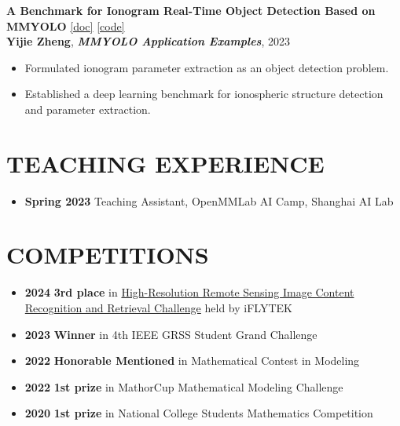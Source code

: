 \documentclass[11pt,a4paper]{article}
\newcommand{\datecolumn}[1]{\textbf{#1}}
\newcommand{\papertitle}[1]{\textbf{#1}}
\newcommand{\journalname}[1]{\textit{\textbf{#1}}}
\begin{document}
\vspace{0.5em}

\papertitle{A Benchmark for Ionogram Real-Time Object Detection Based on MMYOLO}
\href{https://mmyolo.readthedocs.io/en/dev/recommended_topics/application_examples/ionogram_detection.html}{[doc]}
\href{https://github.com/VoyagerXvoyagerx/Ionogram_scaling}{[code]} \\
\textbf{Yijie Zheng}, \journalname{MMYOLO Application Examples}, 2023
\begin{itemize}[leftmargin=1em]
    \item Formulated ionogram parameter extraction as an object detection problem.
    \item Established a deep learning benchmark for ionospheric structure detection and parameter extraction.
\end{itemize}

\vspace{1em}

\section*{TEACHING EXPERIENCE}
\begin{itemize}[leftmargin=1em]
    \item \datecolumn{Spring 2023} Teaching Assistant, OpenMMLab AI Camp, Shanghai AI Lab
\end{itemize}

\vspace{1em}

\section*{COMPETITIONS}
\begin{itemize}[leftmargin=1em]
    \item \datecolumn{2024} \textbf{3rd place} in \href{https://challenge.xfyun.cn/topic/info?type=identification-retrieval}{High-Resolution Remote Sensing Image Content Recognition and Retrieval Challenge} held by iFLYTEK
    \item \datecolumn{2023} \textbf{Winner} in 4th IEEE GRSS Student Grand Challenge
    \item \datecolumn{2022} \textbf{Honorable Mentioned} in Mathematical Contest in Modeling
    \item \datecolumn{2022} \textbf{1st prize} in MathorCup Mathematical Modeling Challenge
    \item \datecolumn{2020} \textbf{1st prize} in National College Students Mathematics Competition
\end{itemize}
\end{document}
